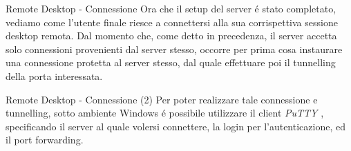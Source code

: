 \documentclass{beamer}
\begin{document}
\begin{frame}{Remote Desktop - Connessione}
Ora che il setup del server \'e stato completato, vediamo come l'utente finale riesce a connettersi alla sua corrispettiva sessione
desktop remota.
\newline
Dal momento che, come detto in precedenza, il server accetta solo connessioni provenienti dal server stesso, occorre per prima cosa instaurare una connessione protetta al server stesso, dal quale effettuare poi il tunnelling della porta interessata.
\end{frame}


\begin{frame}{Remote Desktop - Connessione (2)}
Per poter realizzare tale connessione e tunnelling, sotto ambiente Windows \'e possibile utilizzare il client \emph{PuTTY} ,
 specificando il server al quale volersi connettere, la login per l'autenticazione, ed il port forwarding.


\end{frame}
\end{document}
